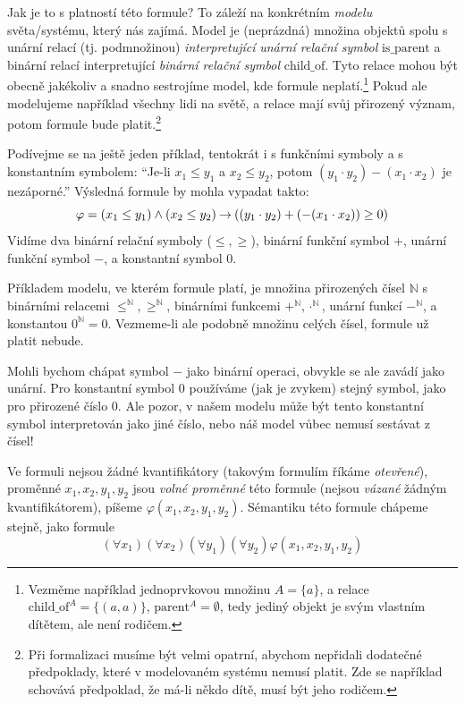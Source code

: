 Jak je to s platností této formule? To záleží na konkrétním \emph{modelu} světa/systému, který nás zajímá. Model je (neprázdná) množina objektů spolu s unární relací (tj. podmnožinou) \emph{interpretující} \emph{unární relační symbol} $\mathrm{is\_parent}$ a binární relací interpretující \emph{binární relační symbol} $\mathrm{child\_of}$. Tyto relace mohou být obecně jakékoliv a snadno sestrojíme model, kde formule neplatí.\footnote{Vezměme například jednoprvkovou množinu $A=\{a\}$, a relace $\mathrm{child\_of}^A=\{(a,a)\}$, $\mathrm{parent}^A=\emptyset$, tedy jediný objekt je svým vlastním dítětem, ale není rodičem.} Pokud ale modelujeme například všechny lidi na světě, a relace mají svůj přirozený význam, potom formule bude platit.\footnote{Při formalizaci musíme být velmi opatrní, abychom nepřidali dodatečné předpoklady, které v modelovaném systému nemusí platit. Zde se například schovává předpoklad, že má-li někdo dítě, musí být jeho rodičem.}

Podívejme se na ještě jeden příklad, tentokrát i s funkčními symboly a s konstantním symbolem: ``Je-li $x_1\leq y_1$ a $x_2\leq y_2$, potom $(y_1 \cdot y_2)-(x_1\cdot x_2)$ je nezáporné.'' Výsledná formule by mohla vypadat takto:
$$
\varphi=(x_1\leq y_1)\land (x_2\leq y_2)\mathbin{\rightarrow} ((y_1 \cdot y_2)+(-(x_1\cdot x_2))\geq 0)
$$
Vidíme dva binární relační symboly ($\leq,\geq$), binární funkční symbol $+$, unární funkční symbol $-$, a konstantní symbol $0$. 

Příkladem modelu, ve kterém formule platí, je množina přirozených čísel $\mathbb N$ s binárními relacemi $\leq^\mathbb N,\geq^\mathbb N$, binárními funkcemi $+^\mathbb N,\cdot^\mathbb N$, unární funkcí $-^\mathbb N$, a konstantou $0^\mathbb N=0$. Vezmeme-li ale podobně množinu celých čísel, formule už platit nebude.

\begin{remark}
Mohli bychom chápat symbol $-$ jako binární operaci, obvykle se ale zavádí jako unární. Pro konstantní symbol $0$ používáme (jak je zvykem) stejný symbol, jako pro přirozené číslo 0. Ale pozor, v našem modelu může být tento konstantní symbol interpretován jako jiné číslo, nebo náš model vůbec nemusí sestávat z čísel!
\end{remark}

Ve formuli nejsou žádné kvantifikátory (takovým formulím říkáme \emph{otevřené}), proměnné $x_1,x_2,y_1,y_2$ jsou \emph{volné proměnné} této formule (nejsou \emph{vázané} žádným kvantifikátorem), píšeme $\varphi(x_1,x_2,y_1,y_2)$. Sémantiku této formule chápeme stejně, jako formule
$$
(\forall x_1)(\forall x_2)(\forall y_1)(\forall y_2)\varphi(x_1,x_2,y_1,y_2)
$$

